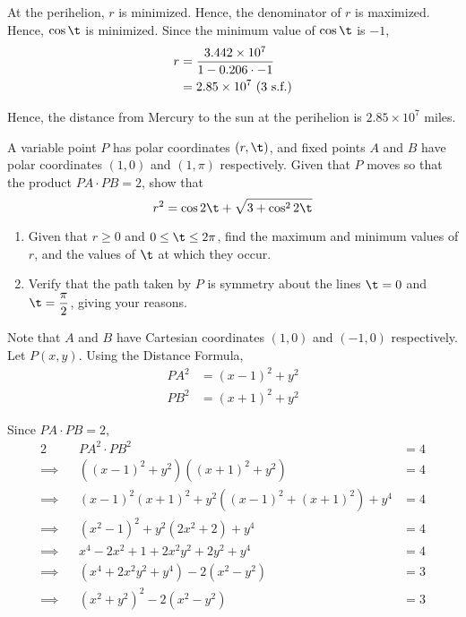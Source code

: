 \documentclass{echw}
\begin{document}
        At the perihelion, $r$ is minimized. Hence, the denominator of $r$ is maximized. Hence, $\cos \t$ is minimized. Since the minimum value of $\cos \t$ is $-1$,
        \begin{align*}
            r &= \dfrac{3.442 \times 10^7}{1 - 0.206\cdot-1}\\
            &= 2.85 \times 10^7 \text{ (3 s.f.)}
        \end{align*}

        Hence, the distance from Mercury to the sun at the perihelion is $2.85 \times 10^7$ miles.


    \problem{}
        A variable point $P$ has polar coordinates $(r, \t)$, and fixed points $A$ and $B$ have polar coordinates $(1, 0)$ and $(1, \pi)$ respectively. Given that $P$ moves so that the product $PA\cdot PB = 2$, show that
        \begin{equation*}
            r^2 = \cos2\t + \sqrt{3 + \cos^22\t}
        \end{equation*}

        \begin{enumerate}
            \item Given that $r \geq 0$ and $0 \leq \t \leq 2\pi$, find the maximum and minimum values of $r$, and the values of $\t$ at which they occur.
            \item Verify that the path taken by $P$ is symmetry about the lines $\t = 0$ and $\t = \dfrac{\pi}{2}$, giving your reasons.
        \end{enumerate}

    \solution
        Note that $A$ and $B$ have Cartesian coordinates $(1, 0)$ and $(-1, 0)$ respectively. Let $P(x, y)$. Using the Distance Formula,
        \begin{align*}
            PA^2 &= (x-1)^2 + y^2\\
            PB^2 &= (x+1)^2 + y^2
        \end{align*}

        Since $PA \cdot PB = 2$,
        \begin{alignat*}{2}
            &&PA^2 \cdot PB^2 &= 4\\
            \implies&&\left((x-1)^2 + y^2\right)\left((x+1)^2 + y^2\right) &= 4\\
            \implies&&(x-1)^2(x+1)^2 + y^2\left((x-1)^2 + (x+1)^2\right) + y^4 &= 4\\
            \implies&&\left(x^2 - 1\right)^2 + y^2\left(2x^2 + 2\right) + y^4 &= 4\\
            \implies&&x^4 - 2x^2 + 1 + 2x^2y^2 + 2y^2 + y^4 &= 4\\
            \implies&&\left(x^4 + 2x^2y^2 + y^4\right) - 2\left(x^2 - y^2\right) &= 3\\
            \implies&&\left(x^2 + y^2\right)^2 - 2\left(x^2 - y^2\right) &= 3
        \end{alignat*}
\end{document}
